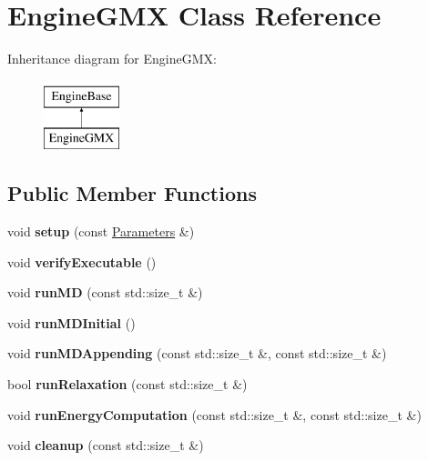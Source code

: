\hypertarget{classEngineGMX}{}\section{Engine\+G\+MX Class Reference}
\label{classEngineGMX}
Inheritance diagram for Engine\+G\+MX\+:\begin{figure}[H]
\begin{center}
\leavevmode
\includegraphics[height=2.000000cm]{classEngineGMX}
\end{center}
\end{figure}
\subsection*{Public Member Functions}
\begin{DoxyCompactItemize}
\item 
\mbox{\label{classEngineGMX_ae56d6737c759974e794a3286f485c892}} 
void {\bfseries setup} (const \mbox{\hyperlink{classParameters}{Parameters}} \&)
\item 
\mbox{\label{classEngineGMX_ae995206760c8c24ae1d6297644dd8525}} 
void {\bfseries verify\+Executable} ()
\item 
\mbox{\label{classEngineGMX_a0215383c1101ce6a6f20a4bd7361b891}} 
void {\bfseries run\+MD} (const std\+::size\+\_\+t \&)
\item 
\mbox{\label{classEngineGMX_a89fcede457959fc7ba656dd0fa1767ac}} 
void {\bfseries run\+M\+D\+Initial} ()
\item 
\mbox{\label{classEngineGMX_a909fb34f58e0fb27d26a3434d0d15a8a}} 
void {\bfseries run\+M\+D\+Appending} (const std\+::size\+\_\+t \&, const std\+::size\+\_\+t \&)
\item 
\mbox{\label{classEngineGMX_a3f58c6d243a78bb9381ce22169733b1c}} 
bool {\bfseries run\+Relaxation} (const std\+::size\+\_\+t \&)
\item 
\mbox{\label{classEngineGMX_a692cc4814a50f113214db669529c8ad4}} 
void {\bfseries run\+Energy\+Computation} (const std\+::size\+\_\+t \&, const std\+::size\+\_\+t \&)
\item 
\mbox{\label{classEngineGMX_aeaabdd6cdaeda2f51f366b4a2788051b}} 
void {\bfseries cleanup} (const std\+::size\+\_\+t \&)
\end{DoxyCompactItemize}
